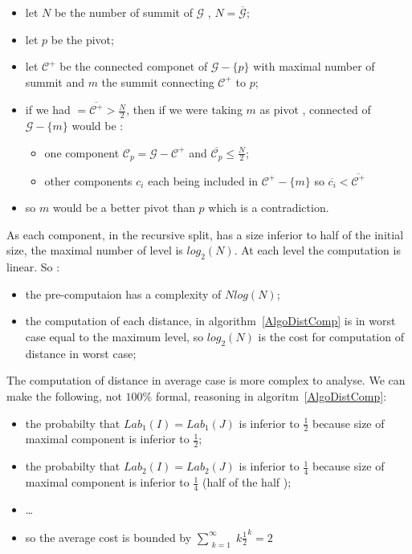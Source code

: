 \documentclass[a4paper]{article}
\begin{document}
\begin{itemize}
     \item let $N$ be the number of summit of $\mathcal{G}$  , $N=\overline{\mathcal{G}}$;
     \item let $p$ be the pivot;
     \item let  $\mathcal{C}^+$ be the connected componet of $\mathcal{G}-\{p\}$ 
           with maximal number of summit and $m$ the summit connecting $\mathcal{C}^+$ to $p$;

     \item if we had   $=\overline{\mathcal{C}^+} > \frac{N}{2}$, then if we were taking $m$ as pivot ,
           connected of $\mathcal{G}-\{m\}$ would be :
          \begin{itemize}
               \item one component $\mathcal{C}_p=\mathcal{G} -\mathcal{C}^+$  and 
                     $\overline{\mathcal{C}_p} \leq \frac{N}{2}$;
               \item other components $c_i$ each being included in $\mathcal{C}^+-\{m\}$ so
                     $\overline{c_i} < \overline{\mathcal{C}^+}$
          \end{itemize}
      \item so $m$ would be a better pivot than $p$ which is a contradiction.
\end{itemize}


As each component, in the recursive split, has a size inferior to half of the initial size,
the maximal number of level is $log_2(N)$.  At each level the computation is linear.
So :

\begin{itemize}
   \item  the pre-computaion has a complexity of $N log(N)$;
   \item  the computation of each distance, in algorithm~\ref{AlgoDistComp} is in worst case equal to 
          the maximum level, so $log_2(N)$ is the cost for computation of distance in worst case;
\end{itemize} 

The computation of distance in average case is more complex to analyse. We
can make the following, not $100\%$ formal, reasoning in algoritm~\ref{AlgoDistComp}:

\begin{itemize}
   \item  the probabilty that  $Lab_1(I)=Lab_1(J)$ is inferior  to $\frac{1}{2}$ because size
          of maximal component is inferior to $\frac{1}{2}$;
   \item  the probabilty that  $Lab_2(I)=Lab_2(J)$ is inferior  to $\frac{1}{4}$ because size
          of maximal component is inferior to $\frac{1}{4}$  (half of the half );
   \item  \dots 
   \item  so the average cost is bounded by $\sum\limits_{\substack{k=1}}^{\infty} k \frac{1}{2}^k = 2$
\end{itemize}
\end{document}
